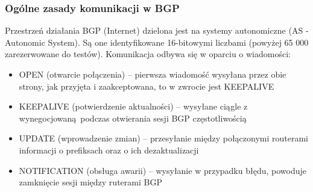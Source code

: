 \documentclass[a4paper, 12pt, titlepage]{article}
\begin{document}
			\subsubsection{Ogólne zasady komunikacji w BGP}
				Przestrzeń działania BGP (Internet) dzielona jest na systemy autonomiczne (AS - Autonomic System). Są one identyfikowane 16-bitowymi liczbami (powyżej 65 000 zarezerwowane do testów). Komunikacja odbywa się w oparciu o wiadomości:
				\begin{itemize}
					\item OPEN (otwarcie połączenia) -- pierwsza wiadomość wysyłana przez obie strony, jak przyjęta i zaakceptowana, to w zwrocie jest KEEPALIVE
					\item KEEPALIVE (potwierdzenie aktualności) -- wysyłane ciągle z wynegocjowaną podczas otwierania sesji BGP częstotliwością
					\item UPDATE (wprowadzenie zmian) -- przesyłanie między połączonymi routerami informacji o prefiksach oraz o ich dezaktualizacji 
					\item NOTIFICATION (obsługa awarii) -- wysyłanie w przypadku błędu, powoduje zamknięcie sesji między ruterami BGP
				\end{itemize}
\end{document}
